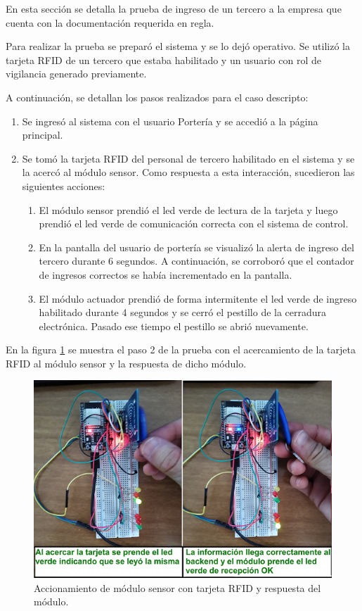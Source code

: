 En esta sección se detalla la prueba de ingreso de un tercero a la empresa que cuenta con la documentación requerida en regla.

Para realizar la prueba se preparó el sistema y se lo dejó operativo. Se utilizó la tarjeta RFID de un tercero que estaba habilitado y un usuario con rol de vigilancia generado previamente.

A continuación, se detallan los pasos realizados para el caso descripto:

\begin{enumerate}
\item Se ingresó al sistema con el usuario Portería y se accedió a la página principal.
\item Se tomó la tarjeta RFID del personal de tercero habilitado en el sistema y se la acercó al módulo sensor. Como respuesta a esta interacción, sucedieron las siguientes acciones:

	\begin{enumerate}
	\item El módulo sensor prendió el led verde de lectura de la tarjeta y luego prendió el led verde de comunicación correcta con el sistema de control.
	\item En la pantalla del usuario de portería se visualizó la alerta de ingreso del tercero durante 6 segundos. A continuación, se corroboró que el contador de ingresos correctos se había incrementado en la pantalla.
	\item El módulo actuador prendió de forma intermitente el led verde de ingreso habilitado durante 4 segundos y se cerró el pestillo de la cerradura electrónica. Pasado ese tiempo el pestillo se abrió nuevamente.
	\end{enumerate}


\end{enumerate}

En la figura \ref{fig:TestTajetaCodigoLeida2} se muestra el paso 2 de la prueba con el acercamiento de la tarjeta RFID al módulo sensor y la respuesta de dicho módulo.

\vspace{1cm}
\begin{figure}[h]
	\centering
	\includegraphics[width=1\textwidth]{./Figures/TestTajetaCodigoLeida.png}
	\caption{Accionamiento de módulo sensor con tarjeta RFID y respuesta del módulo.}
	\label{fig:TestTajetaCodigoLeida2}
\end{figure}


